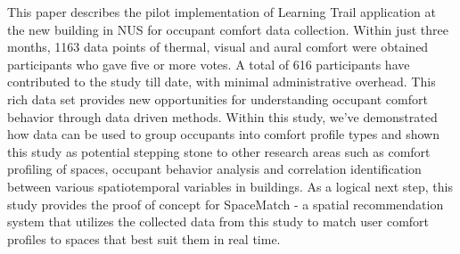 
This paper describes the pilot implementation of Learning Trail application at the new building in NUS for occupant comfort data collection. Within just three months, 1163 data points of thermal, visual and aural comfort were obtained participants who gave five or more votes. A total of 616 participants have contributed to the study till date, with minimal administrative overhead. This rich data set provides new opportunities for understanding occupant comfort behavior through data driven methods. Within this study, we've demonstrated how data can be used to group occupants into comfort profile types and shown this study as potential stepping stone to other research areas such as comfort profiling of spaces, occupant behavior analysis and correlation identification between various spatiotemporal variables in buildings. As a logical next step, this study provides the proof of concept for SpaceMatch - a spatial recommendation system that utilizes the collected data from this study to match user comfort profiles to spaces that best suit them in real time.
